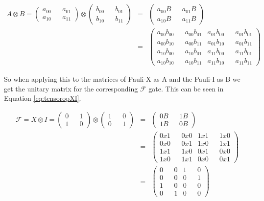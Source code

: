 \begin{eqnarray}
A \otimes B = 
\begin{pmatrix}
a_{00} && a_{01} \\
a_{10} && a_{11}
\end{pmatrix}
\otimes
\begin{pmatrix}
b_{00} && b_{01} \\
b_{10} && b_{11}
\end{pmatrix}
&=&
\begin{pmatrix}
a_{00}B && a_{01}B \\
a_{10}B && a_{11}B
\end{pmatrix} \nonumber \\
&=&
\begin{pmatrix}
a_{00}b_{00} && a_{00}b_{01} & a_{01}b_{00} && a_{01}b_{01}\\
a_{00}b_{10} && a_{00}b_{11} & a_{01}b_{10} && a_{01}b_{11}\\
a_{10}b_{00} && a_{10}b_{01} & a_{11}b_{00} && a_{11}b_{01}\\
a_{10}b_{10} && a_{10}b_{11} & a_{11}b_{10} && a_{11}b_{11}
\end{pmatrix}
\label{eq:tensorop}
\end{eqnarray}

So when applying this to the matrices of Pauli-X as A and the Pauli-I as B we get the unitary matrix for the corresponding $\mathcal{F}$ gate.
This can be seen in Equation \ref{eq:tensoropXI}.

\begin{eqnarray}
  \mathcal{F} =
X \otimes I =
\begin{pmatrix}
0 && 1\\
1 && 0
\end{pmatrix}
\otimes
\begin{pmatrix}
1 && 0 \\
0 && 1
\end{pmatrix} & = & \begin{pmatrix}
0B && 1B \\
1B && 0B
\end{pmatrix}  \nonumber \\
   & = & \begin{pmatrix}
0x1 && 0x0 & 1x1 && 1x0\\
0x0 && 0x1 & 1x0 && 1x1\\
1x1 && 1x0 & 0x1 && 0x0\\
1x0 && 1x1 & 0x0 && 0x1
\end{pmatrix} \nonumber  \\
   & = & \begin{pmatrix}
0 && 0 & 1 && 0\\
0 && 0 & 0 && 1\\
1 && 0 & 0 && 0\\
0 && 1 & 0 && 0
\end{pmatrix}
\label{eq:tensoropXI}
\end{eqnarray}

